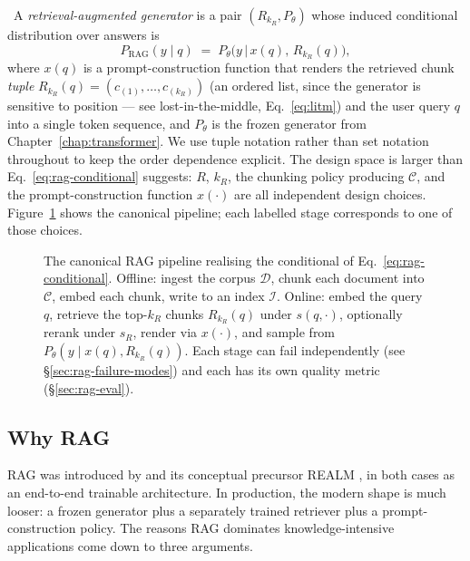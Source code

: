 \Def\ A \emph{retrieval-augmented generator} is a pair $(R_{k_R},
P_\theta)$ whose induced conditional distribution over answers is
\begin{equation}
  P_{\mathrm{RAG}}(y \mid q)
  \;=\; P_\theta\bigl(y \,\big|\, x(q), \, R_{k_R}(q)\bigr),
  \label{eq:rag-conditional}
\end{equation}
where $x(q)$ is a prompt-construction function that renders the
retrieved chunk \emph{tuple} $R_{k_R}(q) = (c_{(1)}, \dots, c_{(k_R)})$
(an ordered list, since the generator is sensitive to position
--- see lost-in-the-middle, Eq.~\eqref{eq:litm}) and the user
query $q$ into a single token sequence, and $P_\theta$ is the
frozen generator from Chapter~\ref{chap:transformer}. We use tuple notation rather than
set notation throughout to keep the order dependence explicit. The design space is
larger than Eq.~\eqref{eq:rag-conditional} suggests: $R$, $k_R$, the
chunking policy producing $\mathcal{C}$, and the prompt-construction
function $x(\cdot)$ are all independent design choices.
Figure~\ref{fig:rag-pipeline} shows the canonical pipeline; each
labelled stage corresponds to one of those choices.

\begin{figure}[ht]
  \centering
  
  \caption{The canonical RAG pipeline realising the conditional of
  Eq.~\eqref{eq:rag-conditional}. Offline: ingest the corpus
  $\mathcal{D}$, chunk each document into $\mathcal{C}$, embed each chunk,
  write to an index $\mathcal{I}$. Online: embed the query $q$, retrieve
  the top-$k_R$ chunks $R_{k_R}(q)$ under $s(q, \cdot)$, optionally
  rerank under $s_R$, render via $x(\cdot)$, and sample from
  $P_\theta(y \mid x(q), R_{k_R}(q))$. Each stage can fail
  independently (see \S\ref{sec:rag-failure-modes}) and each has its
  own quality metric (\S\ref{sec:rag-eval}).}
  \label{fig:rag-pipeline}
\end{figure}

\subsection{Why RAG}

RAG was introduced by \citet{lewis2020retrieval} and its conceptual
precursor REALM \citep{guu2020realm}, in both cases as an end-to-end
trainable architecture. In production, the modern shape is much
looser: a frozen generator plus a separately trained retriever
plus a prompt-construction policy. The reasons RAG dominates
knowledge-intensive applications come down to three arguments.

